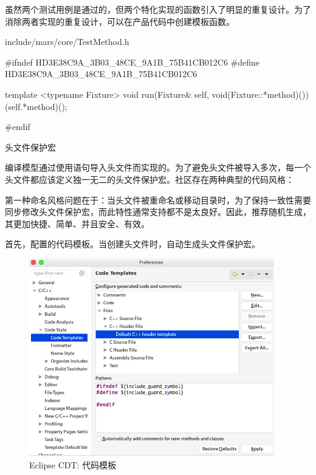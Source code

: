\begin{content}
虽然两个测试用例是通过的，但两个特化实现的函数引入了明显的重复设计。为了消除两者实现的重复设计，可以在产品代码中创建模板函数。

\begin{nodiff}{include/mars/core/TestMethod.h}
\begin{c++}
#ifndef HD3E38C9A_3B03_48CE_9A1B_75B41CB012C6
#define HD3E38C9A_3B03_48CE_9A1B_75B41CB012C6

template <typename Fixture>
void run(Fixture& self, void(Fixture::*method)()) {
  (self.*method)();
}

#endif
\end{c++}
\end{nodiff}

\begin{episode}{头文件保护宏}

\begin{content}

编译模型通过使用语句导入头文件而实现的。为了避免头文件被导入多次，每一个头文件都应该定义独一无二的头文件保护宏。社区存在两种典型的代码风格：

\begin{enum}
\end{enum}

第一种命名风格问题在于：当头文件被重命名或移动目录时，为了保持一致性需要同步修改头文件保护宏，而此特性通常支持都不是太良好。因此，推荐随机生成，其更加快捷、简单、并且安全、有效。

首先，配置的代码模板。当创建头文件时，自动生成头文件保护宏。

\begin{figure}[H]
\centering
\includegraphics[width=0.95\textwidth]{figures/xunit/eclipse-code-template.png}
\caption{Eclipse CDT: 代码模板}
 \label{fig:eclipse-code-template}
\end{figure}


\end{content}
\end{episode}
\end{content}
